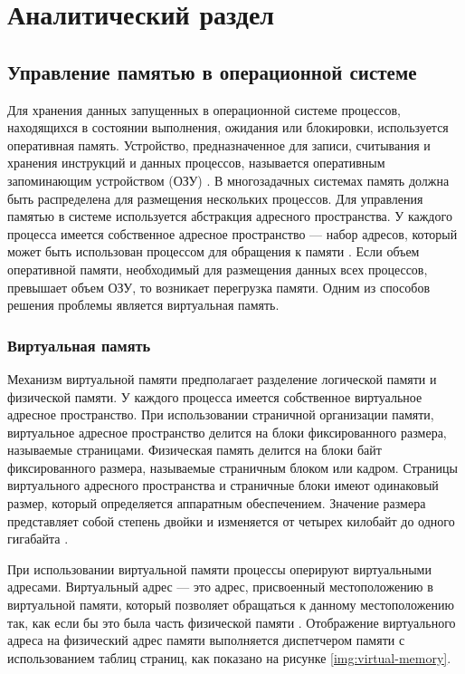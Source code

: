 \chapter{Аналитический раздел}

\section{Управление памятью в операционной системе}

Для хранения данных запущенных в операционной системе процессов, находящихся в состоянии выполнения, ожидания или блокировки, используется оперативная память. Устройство, предназначенное для записи, считывания и хранения инструкций и данных процессов, называется оперативным запоминающим устройством (ОЗУ) \cite{ram}. В многозадачных системах память должна быть распределена для размещения нескольких процессов. Для управления памятью в системе используется абстракция адресного пространства. У каждого процесса имеется собственное адресное пространство --- набор адресов, который может быть использован процессом для обращения к памяти \cite{address-space}. Если объем оперативной памяти, необходимый для размещения данных всех процессов, превышает объем ОЗУ, то возникает перегрузка памяти. Одним из способов решения проблемы является виртуальная память.

\subsection{Виртуальная память}

Механизм виртуальной памяти предполагает разделение логической памяти и физической памяти. У каждого процесса имеется собственное виртуальное адресное пространство. При использовании страничной организации памяти, виртуальное адресное пространство делится на блоки фиксированного размера, называемые страницами. Физическая память делится на блоки байт фиксированного размера, называемые страничным блоком или кадром. Страницы виртуального адресного пространства и страничные блоки имеют одинаковый размер, который определяется аппаратным обеспечением. Значение размера представляет собой степень двойки и изменяется от четырех килобайт до одного гигабайта \cite{swapping}.

При использовании виртуальной памяти процессы оперируют виртуальными адресами. Виртуальный адрес --- это адрес, присвоенный местоположению в виртуальной памяти, который позволяет обращаться к данному местоположению так, как если бы это была часть физической памяти \cite{address-space}. Отображение виртуального адреса на физический адрес памяти выполняется диспетчером памяти с использованием таблиц страниц, как показано на рисунке \ref{img:virtual-memory}.

